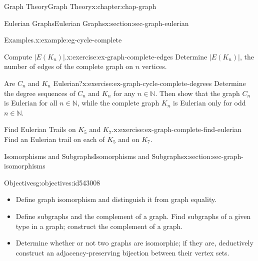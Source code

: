 \documentclass[oneside,10pt,]{book}
\numberwithin{equation}{section}
\begin{document}
\begin{chapterptx}{Graph Theory}{}{Graph Theory}{}{}{x:chapter:chap-graph}
\begin{sectionptx}{Eulerian Graphs}{}{Eulerian Graphs}{}{}{x:section:sec-graph-eulerian}
\begin{example}{Examples.}{x:example:eg-cycle-complete}
\begin{sidebyside}{4}{0.035}{0.035}{0.07}
\begin{sbspanel}{0.2}
{
}%
\end{sbspanel}%
\end{sidebyside}%
\end{example}
\begin{inlineexercise}{Compute \(|E(K_n)|\).}{x:exercise:ex-graph-complete-edges}%
Determine \(|E(K_n)|\), the number of edges of the complete graph on \(n\) vertices.%
\end{inlineexercise}%
\begin{inlineexercise}{Are \(C_n\) and \(K_n\) Eulerian?}{x:exercise:ex-graph-cycle-complete-degrees}%
Determine the degree sequences of \(C_n\) and \(K_n\) for any \(n \in \mathbb{N}\). Then show that the graph \(C_n\) is Eulerian for all \(n \in \mathbb{N}\), while the complete graph \(K_n\) is Eulerian only for odd \(n \in \mathbb{N}\).%
\end{inlineexercise}%
\begin{inlineexercise}{Find Eulerian Trails on \(K_5\) and \(K_7\).}{x:exercise:ex-graph-complete-find-eulerian}%
Find an Eulerian trail on each of \(K_5\) and on \(K_7\).%
\end{inlineexercise}%
\end{sectionptx}
%
%
\typeout{************************************************}
\typeout{************************************************}
%
\begin{sectionptx}{Isomorphisms and Subgraphs}{}{Isomorphisms and Subgraphs}{}{}{x:section:sec-graph-isomorphisms}
\begin{objectives}{Objectives}{g:objectives:id543008}
%
\begin{itemize}[label=\textbullet]
\item{}Define graph isomorphism and distinguish it from graph equality.%
\item{}Define subgraphs and the complement of a graph. Find subgraphs of a given type in a graph; construct the complement of a graph.%
\item{}Determine whether or not two graphs are isomorphic; if they are, deductively construct an adjacency-preserving bijection between their vertex sets.%

\end{itemize}
\end{objectives}
\end{sectionptx}
\end{chapterptx}
\end{document}
